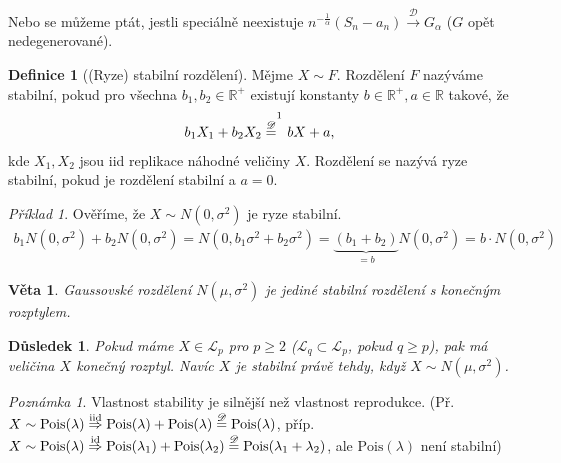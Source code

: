 \documentclass{article}
\newtheorem{theorem}[subsubsection]{Věta}
\theoremstyle{remark}
\newtheorem*{remark}{Poznámka}
\theoremstyle{plain}
\newtheorem{dusl}[subsubsection]{Důsledek}
\theoremstyle{definition}
\newtheorem{definition}[subsubsection]{Definice}
\theoremstyle{remark}
\newtheorem*{example}{Příklad}
\begin{document}
Nebo se můžeme ptát, jestli speciálně neexistuje $n^{-\frac{1}{\alpha}}(S_n-a_n)\xrightarrow{\mathscr{D}} G_{\alpha}$ ($G$ opět nedegenerované).

\begin{definition}[(Ryze) stabilní rozdělení]
Mějme $X\sim F$. Rozdělení $F$ nazýváme stabilní, pokud pro všechna $b_1,b_2\in\mathbb{R}^{+}$ existují konstanty $b\in\mathbb{R}^{+},a\in\mathbb{R}$ takové, že
\begin{align*}
    b_1X_1+b_2X_2\stackrel{\mathscr{D}}{=}^{\footnotemark{}}bX+a,
\end{align*}
kde $X_1,X_2$ jsou iid replikace náhodné veličiny $X$. Rozdělení se nazývá ryze stabilní, pokud je rozdělení stabilní a $a=0$.
\end{definition}

\begin{example}
Ověříme, že $X\sim N(0,\sigma^2)$ je ryze stabilní.
\begin{align*}
    b_1N(0,\sigma^2)+b_2N(0,\sigma^2)=N(0,b_1\sigma^2+b_2\sigma^2)=\underbrace{(b_1+b_2)}_{=b}N(0,\sigma^2)=b\cdot N(0,\sigma^2)
\end{align*}
\end{example}

\begin{theorem}
Gaussovské rozdělení $N(\mu,\sigma^2)$ je jediné stabilní rozdělení s konečným rozptylem.
\end{theorem}

\begin{dusl}
Pokud máme $X\in\mathscr{L}_p$ pro $p\geq 2$ ($\mathscr{L}_q\subset\mathscr{L}_p$, pokud $q\geq p$), pak má veličina $X$ konečný rozptyl. Navíc $X$ je stabilní právě tehdy, když $X\sim N(\mu,\sigma^2)$.
\end{dusl}

\begin{remark}
Vlastnost stability je silnější než vlastnost reprodukce. (Př. $X\sim \mathrm{Pois}(\lambda)\stackrel{\textnormal{iid}}{\Rightarrow}\mathrm{Pois}(\lambda)+\mathrm{Pois}(\lambda)\stackrel{\mathscr{D}}{=}\mathrm{Pois}(\lambda)$, příp. $X\sim \mathrm{Pois}(\lambda)\stackrel{\textnormal{id}}{\Rightarrow}\mathrm{Pois}(\lambda_1)+\mathrm{Pois}(\lambda_2)\stackrel{\mathscr{D}}{=}\mathrm{Pois}(\lambda_1+\lambda_2)$, ale $\mathrm{Pois}(\lambda)$ není stabilní)
\end{remark}
\end{document}
